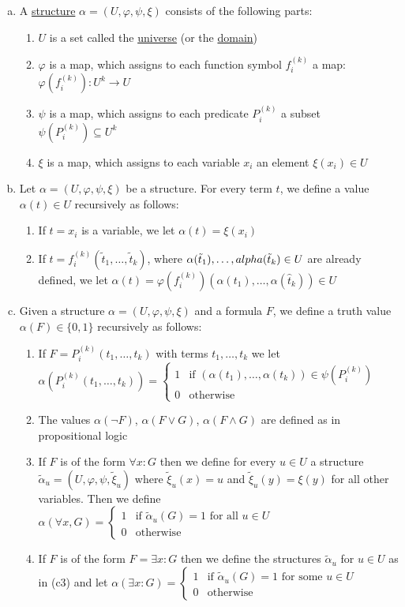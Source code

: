\documentclass[a4paper]{article}
\newcommand{\ul}{\underline}
\let\phi\varphi
\begin{document}
\begin{enumerate}[(a)]
	\item A \ul{structure} $\alpha=(U,\phi,\psi,\xi)$ consists of the following parts:
	\begin{enumerate}[(\text{a}1)]
		\item $U$ is a set called the \ul{universe} (or the \ul{domain})
		\item $\phi$ is a map, which assigns to each function symbol $f_i^{(k)}$ a map: $\phi(f_i^{(k)}):U^k\rightarrow U$
		\item $\psi$ is a map, which assigns to each predicate $P_i^{(k)}$ a subset $\psi(P_i^{(k)})\subseteq U^k$
		\item $\xi$ is a map, which assigns to each variable $x_i$ an element $\xi(x_i)\in U$
	\end{enumerate}
	\item Let $\alpha=(U,\phi,\psi,\xi)$ be a structure. For every term $t$, we define a value $\alpha(t)\in U$ recursively as follows:
	\begin{enumerate}[(b1)]
		\item If $t=x_i$ is a variable, we let $\alpha(t)=\xi(x_i)$
		\item If $t=f_i^{(k)}(\tilde t_1,\dots,\tilde t_k)$, where $\alpha(\tilde t_1),\dots,\\alpha(\tilde t_k)\in U$ are already defined, we let $\alpha(t)=\phi(f_i^{(k)})(\alpha(t_1),\dots,\alpha(\hat t_k))\in U$
	\end{enumerate}
	\item Given a structure $\alpha=(U,\phi,\psi,\xi)$ and a formula $F$, we define a truth value $\alpha(F)\in\{0,1\}$ recursively as follows:
	\begin{enumerate}[(c1)]
		\item If $F=P_i^{(k)}(t_1,\dots,t_k)$ with terms $t_1,\dots,t_k$ we let $\alpha(P_i^{(k)}(t_1,\dots,t_k))=\begin{cases}
		1 & \text{if }(\alpha(t_1),\dots,\alpha(t_k))\in\psi(P_i^{(k)})\\
		0 & \text{otherwise}
		\end{cases}$
		\item The values $\alpha(\neg F)$, $\alpha(F\vee G)$, $\alpha(F\wedge G)$ are defined as in propositional logic
		\item If $F$ is of the form $\forall x:G$ then we define for every $u\in U$ a structure $\tilde\alpha_u=(U,\phi,\psi,\tilde\xi_u)$ where $\tilde\xi_u(x)=u$ and $\tilde\xi_u(y)=\xi(y)$ for all other variables. Then we define $\alpha(\forall x, G)=\begin{cases}
		1 & \text{if } \tilde\alpha_u(G)=1 \text{ for all } u\in U\\
		0 & \text{otherwise}
		\end{cases}$
		\item If $F$ is of the form $F=\exists x : G$ then we define the structures $\tilde\alpha_u$ for $u\in U$ as in (c3) and let $\alpha(\exists x:G)=\begin{cases}
		1 & \text{if } \tilde\alpha_u(G)=1 \text{ for some } u\in U\\
		0 & \text{otherwise}
		\end{cases}$
	\end{enumerate}
\end{enumerate}
\end{document}
